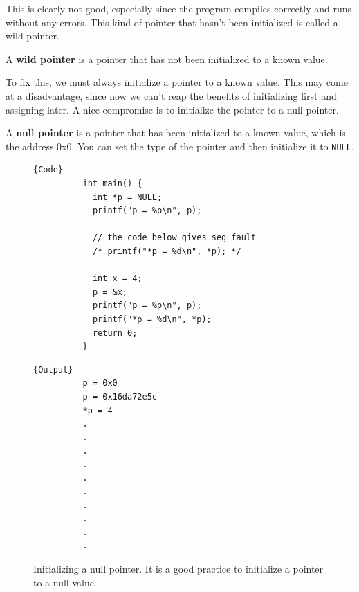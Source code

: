 \documentclass{article}
\begin{document}
      This is clearly not good, especially since the program compiles correctly and runs without any errors. This kind of pointer that hasn't been initialized is called a wild pointer. 

      \begin{definition}
        A \textbf{wild pointer} is a pointer that has not been initialized to a known value. 
      \end{definition}

      To fix this, we must always initialize a pointer to a known value. This may come at a disadvantage, since now we can't reap the benefits of initializing first and assigning later. A nice compromise is to initialize the pointer to a null pointer. 

      \begin{definition}
        A \textbf{null pointer} is a pointer that has been initialized to a known value, which is the address 0x0. You can set the type of the pointer and then initialize it to \texttt{NULL}. 
      \begin{figure}[H]
        \centering 
        \noindent\begin{minipage}{.5\textwidth}
        \begin{lstlisting}[]{Code}
          int main() { 
            int *p = NULL; 
            printf("p = %p\n", p); 
            
            // the code below gives seg fault
            /* printf("*p = %d\n", *p); */

            int x = 4; 
            p = &x; 
            printf("p = %p\n", p); 
            printf("*p = %d\n", *p);
            return 0; 
          }
        \end{lstlisting}
        \end{minipage}
        \hfill
        \begin{minipage}{.49\textwidth}
        \begin{lstlisting}[]{Output}
          p = 0x0
          p = 0x16da72e5c
          *p = 4
          .
          .
          .
          .
          .
          .
          .
          .
          .
          .
        \end{lstlisting}
        \end{minipage}
        \caption{Initializing a null pointer. It is a good practice to initialize a pointer to a null value. } 
        \label{fig:null_pointer}
      \end{figure}
      \end{definition}
\end{document}
